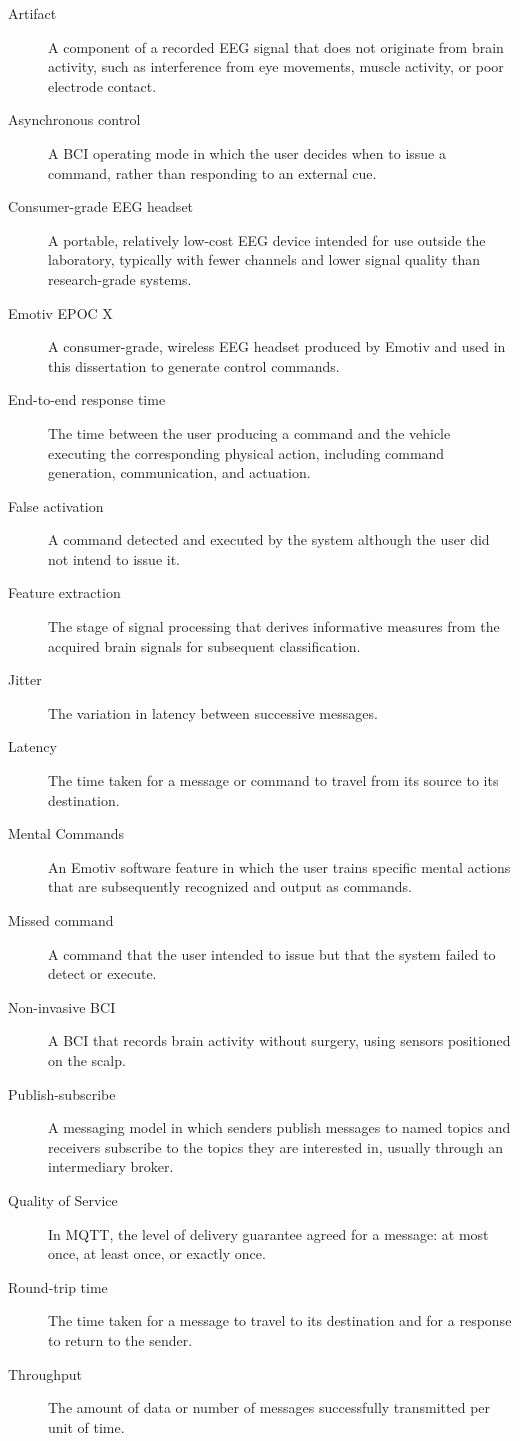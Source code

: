 
\begin{description}
  \item[Artifact] A component of a recorded EEG signal that does not originate from brain activity, such as interference from eye movements, muscle activity, or poor electrode contact.
  \item[Asynchronous control] A BCI operating mode in which the user decides when to issue a command, rather than responding to an external cue.
  \item[Consumer-grade EEG headset] A portable, relatively low-cost EEG device intended for use outside the laboratory, typically with fewer channels and lower signal quality than research-grade systems.
  \item[Emotiv EPOC X] A consumer-grade, wireless EEG headset produced by Emotiv and used in this dissertation to generate control commands.
  \item[End-to-end response time] The time between the user producing a command and the vehicle executing the corresponding physical action, including command generation, communication, and actuation.
  \item[False activation] A command detected and executed by the system although the user did not intend to issue it.
  \item[Feature extraction] The stage of signal processing that derives informative measures from the acquired brain signals for subsequent classification.
  \item[Jitter] The variation in latency between successive messages.
  \item[Latency] The time taken for a message or command to travel from its source to its destination.
  \item[Mental Commands] An Emotiv software feature in which the user trains specific mental actions that are subsequently recognized and output as commands.
  \item[Missed command] A command that the user intended to issue but that the system failed to detect or execute.
  \item[Non-invasive BCI] A BCI that records brain activity without surgery, using sensors positioned on the scalp.
  \item[Publish-subscribe] A messaging model in which senders publish messages to named topics and receivers subscribe to the topics they are interested in, usually through an intermediary broker.
  \item[Quality of Service] In MQTT, the level of delivery guarantee agreed for a message: at most once, at least once, or exactly once.
  \item[Round-trip time] The time taken for a message to travel to its destination and for a response to return to the sender.
  \item[Throughput] The amount of data or number of messages successfully transmitted per unit of time.
\end{description}

